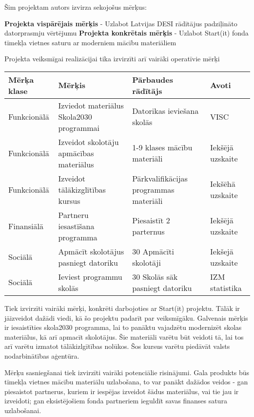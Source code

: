 \par
Šim projektam autors izvirza sekojošus mērķus:
\par
\textbf{Projekta vispārējais mērķis} - Uzlabot Latvijas DESI rādītājus padziļināto datorprasmju vērtējumu
\textbf{Projekta konkrētais mērķis} - Uzlabot Start(it) fonda tīmekļa vietnes saturu ar moderniem mācību materiāliem 
\par
Projekta veiksmīgai realizācijai tika izvirzīti arī vairāki operatīvie mērķi
\begin{table}[!ht]
    \centering
    \begin{tabular}{|p{}|p{}|p{}|p{}|}
        \hline
        \textbf{Mērķa klase} & \textbf{Mērķis} & \textbf{Pārbaudes rādītājs} & \textbf{Avoti} \\
        \hline
        Funkcionālā & Izviedot materiālus Skola2030 programmai & Datorikas ieviešana skolās & VISC \\
        \hline
        Funkcionālā & Izveidot skolotāju apmācības materiālus & 1-9 klases mācību materiāli & Iekšējā uzskaite \\
        \hline
        Funkcionālā & Izveidot tālākizglītības kursus & Pārkvalifikācijas programmas materiāli & Iekšēhā uzskaite \\
        \hline
        Finansiālā & Partneru iesastīšana programma & Piesaistīt 2 parternus & Iekšējā uzskaite \\
        \hline
        Sociālā & Apmācīt skolotājus pasniegt datoriku & 30 Apmācīti skolotāji & Iekšejā uzskaite \\
        \hline
        Sociālā & Ieviest programmu skolās & 30 Skolās sāk pasniegt datoriku & IZM statistika \\
        \hline 
    \end{tabular}
\end{table}
\par
Tiek izvirzīti vairāki mērķi, konkrēti darbojoties ar Start(it) projektu. Tālāk ir jāizveidot dažādi viedi, kā
šo projektu padarīt par veiksmīgāku. Galvenais mērķis ir iesaistīties skola2030 programma, lai to panāktu vajadzētu
modernizēt skolas materiālus, kā arī apmacīt skolotājus. Šie materiāli varētu būt veidoti tā, lai tos arī varētu
izmatot tālākizlgītības nolūkos. Šos kursus varētu piedāvāt valsts nodarbinātības aģentūra.
\par
Mērķu sasniegšanai tiek izvirzīti vairāki potenciālie risinājumi. Gala produkts būs tīmekļa vietnes mācību
materiālu uzlabošana, to var panākt dažādos veidos - gan piesaistot partnerus, kuriem ir iespējas izveidot
šādus materiālus, vai tie jau ir izveidoti; gan eksistējošiem fonda partneriem ieguldīt savas finanses 
satura uzlabošanai.

